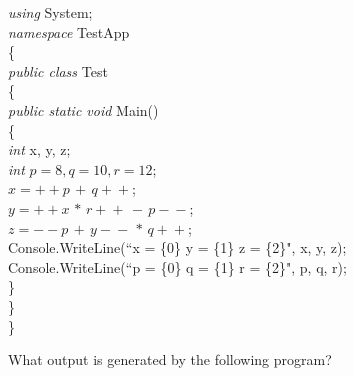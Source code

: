 {\begin{list}{E \thechapter.\theenumi}
\emph{using} System;\\
\emph{namespace} TestApp\\
\{\\
\hspace*{0.2in}    \emph{public class} Test\\
\hspace*{0.2in}    \{\\
\hspace*{0.4in}        \emph{public static void} Main()\\
\hspace*{0.4in}        \{\\
\hspace*{0.6in}            \emph{int} x, y, z;\\
\hspace*{0.6in}            \emph{int} $p = 8, q = 10, r = 12$;\\
\hspace*{0.6in}            $x = +\!+\!p \,+\, q\!+\!+$;\\
\hspace*{0.6in}            $y = +\!+\!x \,\ast\, r\!+\!+ \,-\, p\!-\!-$;\\
\hspace*{0.6in}            $z = -\!-\!p \,+\, y\!-\!- \,\ast\, q\!+\!+$;\\
\hspace*{0.6in}            Console.WriteLine(``x = \{0\}  y =
\{1\}  z = \{2\}", x, y, z);\\
\hspace*{0.6in}            Console.WriteLine(``p = \{0\}  q =
\{1\}  r = \{2\}", p, q, r);\\
\hspace*{0.4in}        \}\\
\hspace*{0.2in}    \}\\
\}


\item What output is generated by the following program?


\end{list}}
